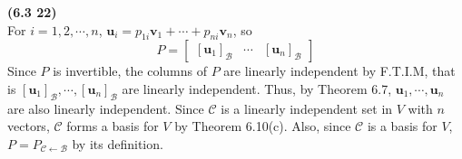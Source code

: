 \textbf{(6.3 22)} \\
For $i = 1, 2, \cdots, n$, $\textbf{u}_i = p_{1i}\textbf{v}_1 + \cdots + p_{ni}\textbf{v}_n$, so \begin{equation*}
	P = \begin{bmatrix}
		\left[\textbf{u}_1\right]_\mathcal{B} & \cdots & \left[\textbf{u}_n\right]_\mathcal{B}
	\end{bmatrix}
\end{equation*} Since $P$ is invertible, the columns of $P$ are linearly independent by F.T.I.M, that is $\left[\textbf{u}_1\right]_\mathcal{B}, \cdots, \left[\textbf{u}_n\right]_\mathcal{B}$ are linearly independent. Thus, by Theorem 6.7, $\textbf{u}_1, \cdots, \textbf{u}_n$ are also linearly independent. Since $\mathcal{C}$ is a linearly independent set in $V$ with $n$ vectors, $\mathcal{C}$ forms a basis for $V$ by Theorem 6.10(c). Also, since $\mathcal{C}$ is a basis for $V$, $P = P_{ \mathcal{C} \leftarrow \mathcal{B} }$ by its definition. \\

